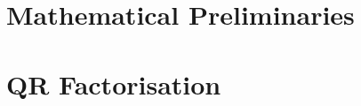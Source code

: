 \documentclass[a4paper,11pt,twoside]{report}
\begin{document}
\chapter{Mathematical Preliminaries}


\chapter{QR Factorisation}


% 

% 

% 

% 
% 
\end{document}
